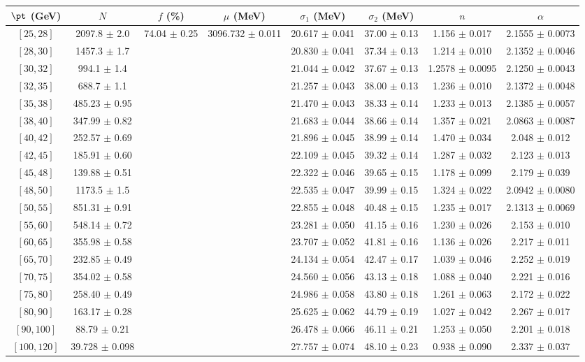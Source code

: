 \begin{tabular}{c||c|c|c|c|c|c|c}
$\pt$ (GeV) & $N$ & $f$ (\%) & $\mu$ (MeV) & $\sigma_1$ (MeV) & $\sigma_2$ (MeV) & $n$ & $\alpha$ \\
\hline
$[25, 28]$ & 2097.8 $\pm$ 2.0 & \multirow{19}{*}{74.04 $\pm$ 0.25} & \multirow{19}{*}{3096.732 $\pm$ 0.011} & 20.617 $\pm$ 0.041 & 37.00 $\pm$ 0.13 & 1.156 $\pm$ 0.017 & 2.1555 $\pm$ 0.0073\\
$[28, 30]$ & 1457.3 $\pm$ 1.7 &  &  & 20.830 $\pm$ 0.041 & 37.34 $\pm$ 0.13 & 1.214 $\pm$ 0.010 & 2.1352 $\pm$ 0.0046\\
$[30, 32]$ & 994.1 $\pm$ 1.4 &  &  & 21.044 $\pm$ 0.042 & 37.67 $\pm$ 0.13 & 1.2578 $\pm$ 0.0095 & 2.1250 $\pm$ 0.0043\\
$[32, 35]$ & 688.7 $\pm$ 1.1 &  &  & 21.257 $\pm$ 0.043 & 38.00 $\pm$ 0.13 & 1.236 $\pm$ 0.010 & 2.1372 $\pm$ 0.0048\\
$[35, 38]$ & 485.23 $\pm$ 0.95 &  &  & 21.470 $\pm$ 0.043 & 38.33 $\pm$ 0.14 & 1.233 $\pm$ 0.013 & 2.1385 $\pm$ 0.0057\\
$[38, 40]$ & 347.99 $\pm$ 0.82 &  &  & 21.683 $\pm$ 0.044 & 38.66 $\pm$ 0.14 & 1.357 $\pm$ 0.021 & 2.0863 $\pm$ 0.0087\\
$[40, 42]$ & 252.57 $\pm$ 0.69 &  &  & 21.896 $\pm$ 0.045 & 38.99 $\pm$ 0.14 & 1.470 $\pm$ 0.034 & 2.048 $\pm$ 0.012\\
$[42, 45]$ & 185.91 $\pm$ 0.60 &  &  & 22.109 $\pm$ 0.045 & 39.32 $\pm$ 0.14 & 1.287 $\pm$ 0.032 & 2.123 $\pm$ 0.013\\
$[45, 48]$ & 139.88 $\pm$ 0.51 &  &  & 22.322 $\pm$ 0.046 & 39.65 $\pm$ 0.15 & 1.178 $\pm$ 0.099 & 2.179 $\pm$ 0.039\\
$[48, 50]$ & 1173.5 $\pm$ 1.5 &  &  & 22.535 $\pm$ 0.047 & 39.99 $\pm$ 0.15 & 1.324 $\pm$ 0.022 & 2.0942 $\pm$ 0.0080\\
$[50, 55]$ & 851.31 $\pm$ 0.91 &  &  & 22.855 $\pm$ 0.048 & 40.48 $\pm$ 0.15 & 1.235 $\pm$ 0.017 & 2.1313 $\pm$ 0.0069\\
$[55, 60]$ & 548.14 $\pm$ 0.72 &  &  & 23.281 $\pm$ 0.050 & 41.15 $\pm$ 0.16 & 1.230 $\pm$ 0.026 & 2.153 $\pm$ 0.010\\
$[60, 65]$ & 355.98 $\pm$ 0.58 &  &  & 23.707 $\pm$ 0.052 & 41.81 $\pm$ 0.16 & 1.136 $\pm$ 0.026 & 2.217 $\pm$ 0.011\\
$[65, 70]$ & 232.85 $\pm$ 0.49 &  &  & 24.134 $\pm$ 0.054 & 42.47 $\pm$ 0.17 & 1.039 $\pm$ 0.046 & 2.252 $\pm$ 0.019\\
$[70, 75]$ & 354.02 $\pm$ 0.58 &  &  & 24.560 $\pm$ 0.056 & 43.13 $\pm$ 0.18 & 1.088 $\pm$ 0.040 & 2.221 $\pm$ 0.016\\
$[75, 80]$ & 258.40 $\pm$ 0.49 &  &  & 24.986 $\pm$ 0.058 & 43.80 $\pm$ 0.18 & 1.261 $\pm$ 0.063 & 2.172 $\pm$ 0.022\\
$[80, 90]$ & 163.17 $\pm$ 0.28 &  &  & 25.625 $\pm$ 0.062 & 44.79 $\pm$ 0.19 & 1.027 $\pm$ 0.042 & 2.267 $\pm$ 0.017\\
$[90, 100]$ & 88.79 $\pm$ 0.21 &  &  & 26.478 $\pm$ 0.066 & 46.11 $\pm$ 0.21 & 1.253 $\pm$ 0.050 & 2.201 $\pm$ 0.018\\
$[100, 120]$ & 39.728 $\pm$ 0.098 &  &  & 27.757 $\pm$ 0.074 & 48.10 $\pm$ 0.23 & 0.938 $\pm$ 0.090 & 2.337 $\pm$ 0.037\\
\end{tabular}
